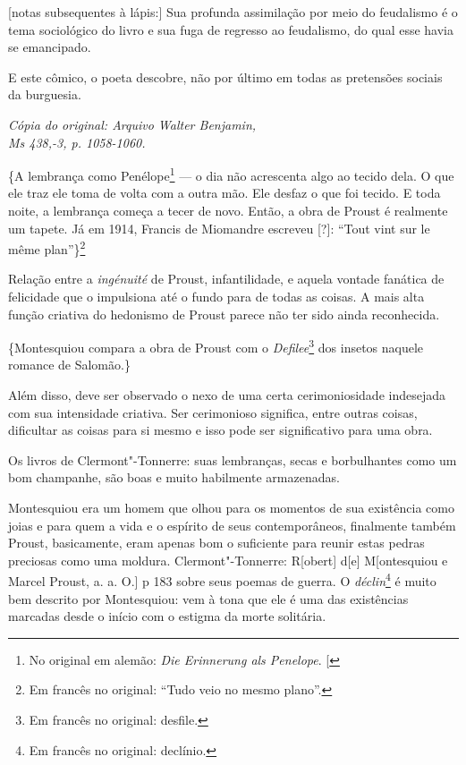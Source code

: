 {[}notas subsequentes à lápis:{]} Sua profunda assimilação por meio do
feudalismo é o tema sociológico do livro e sua fuga de regresso ao
feudalismo, do qual esse havia se emancipado.

E este cômico, o poeta descobre, não por último em todas as pretensões
sociais da burguesia.

\begin{flushright}
\emph{\footnotesize{Cópia do original: Arquivo Walter Benjamin,\\ Ms 438,-3, p. 1058-1060.}}
\end{flushright}

\{A lembrança como Penélope\footnote{No original em alemão: \emph{Die Erinnerung als Penelope}. {[}\versal{N. T.}{]}} --- o dia não acrescenta algo ao tecido dela.
O que ele traz ele toma de volta com a outra mão. Ele desfaz
o que foi tecido. E toda noite, a lembrança começa a tecer de novo.
Então, a obra de Proust é realmente um tapete. Já em 1914, Francis de
Miomandre escreveu {[}?{]}: ``Tout vint sur le même plan''\}\footnote{Em francês no original: ``Tudo veio no mesmo plano''. \versal{[N. T.]}}

Relação entre a \emph{ingénuité} de Proust, infantilidade, e aquela
vontade fanática de felicidade que o impulsiona até o fundo para de %
todas as coisas. A mais alta função criativa do hedonismo de Proust
parece não ter sido ainda reconhecida.

\{Montesquiou compara a obra de Proust com o \emph{Defilee}\footnote{Em francês no original: desfile. \versal{[N. T.]}} dos insetos naquele romance de
Salomão.\}

Além disso, deve ser observado o nexo de uma certa cerimoniosidade
indesejada com sua intensidade criativa. Ser cerimonioso significa,
entre outras coisas, dificultar as coisas para si mesmo e isso pode ser
significativo para uma obra.

Os livros de Clermont"-Tonnerre: suas lembranças, secas e borbulhantes
como um bom champanhe, são boas e muito habilmente armazenadas.

Montesquiou era um homem que olhou para os momentos de sua existência
como joias e para quem a vida e o espírito de seus contemporâneos,
finalmente também Proust, basicamente, eram apenas bom o suficiente para
reunir estas pedras preciosas como uma moldura. Clermont"-Tonnerre: R{[}obert{]} d{[}e{]} M{[}ontesquiou e Marcel Proust, a. a. O.{]} p
183 sobre seus poemas de guerra. O \emph{déclin}\footnote{Em francês no original: declínio. \versal{[N. T.]}} é muito bem descrito por
Montesquiou: vem à tona que ele é uma das existências marcadas desde o
início com o estigma da morte solitária.

